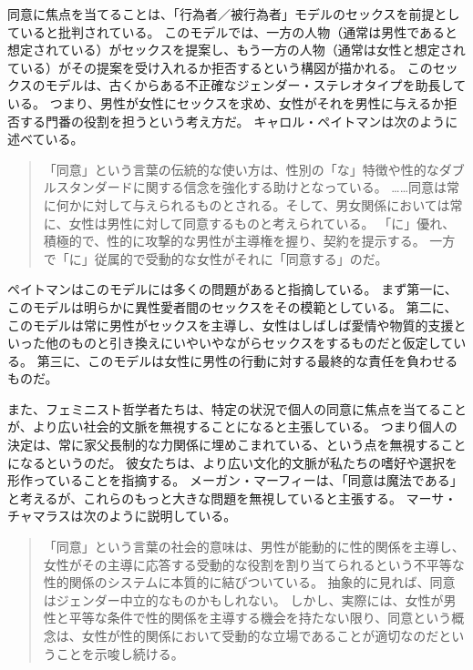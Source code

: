 \documentclass[paper=a4,book,openany]{jlreq}
\newcommand{\ig}[1]{}           %
\begin{document}
同意に焦点を当てることは、「行為者／被行為者」モデルのセックスを前提としていると批判されている。
このモデルでは、一方の人物（通常は男性であると想定されている）がセックスを提案し、もう一方の人物（通常は女性と想定されている）がその提案を受け入れるか拒否するという構図が描かれる。
このセックスのモデルは、古くからある不正確なジェンダー・ステレオタイプを助長している。
つまり、男性が女性にセックスを求め、女性がそれを男性に与えるか拒否する門番の役割を担うという考え方だ。
キャロル・ペイトマンは次のように述べている。

\begin{quote}
「同意」という言葉の伝統的な使い方は、性別の「な」特徴や性的なダブルスタンダードに関する信念を強化する助けとなっている。
……同意は常に何かに対して与えられるものとされる。そして、男女関係においては常に、女性は男性に対して同意するものと考えられている。
「に」優れ、積極的で、性的に攻撃的な男性が主導権を握り、契約を提示する。
一方で「に」従属的で受動的な女性がそれに「同意する」のだ。
\citep[p.164]{pateman80:_woman_consen}
\end{quote}

ペイトマンはこのモデルには多くの問題があると指摘している。
まず第一に、このモデルは明らかに異性愛者間のセックスをその模範としている。
第二に、このモデルは常に男性がセックスを主導し、女性はしばしば愛情や物質的支援といった他のものと引き換えにいやいやながらセックスをするものだと仮定している。
第三に、このモデルは女性に男性の行動に対する最終的な責任を負わせるものだ。

また、フェミニスト哲学者たちは、特定の状況で個人の同意に焦点を当てることが、より広い社会的文脈を無視することになると主張している。
つまり個人の決定は、常に家父長制的な力関係に埋めこまれている、という点を無視することになるというのだ。
彼女たちは、より広い文化的文脈が私たちの嗜好や選択を形作っていることを指摘する。
メーガン・マーフィー\ig{Meghan Murphy}は、「同意は魔法である」と考えるが、これらのもっと大きな問題を無視していると主張する\citep{murphy13:_tyran_consen}。
マーサ・チャマラスは次のように説明している。

\begin{quote}
  「同意」という言葉の社会的意味は、男性が能動的に性的関係を主導し、女性がその主導に応答する受動的な役割を割り当てられるという不平等な性的関係のシステムに本質的に結びついている。
抽象的に見れば、同意はジェンダー中立的なものかもしれない。
しかし、実際には、女性が男性と平等な条件で性的関係を主導する機会を持たない限り、同意という概念は、女性が性的関係において受動的な立場であることが適切なのだということを示唆し続ける。
\citep[pp.814-815]{chamallas88:_consen_equal_legalb}
\end{quote}
\end{document}
